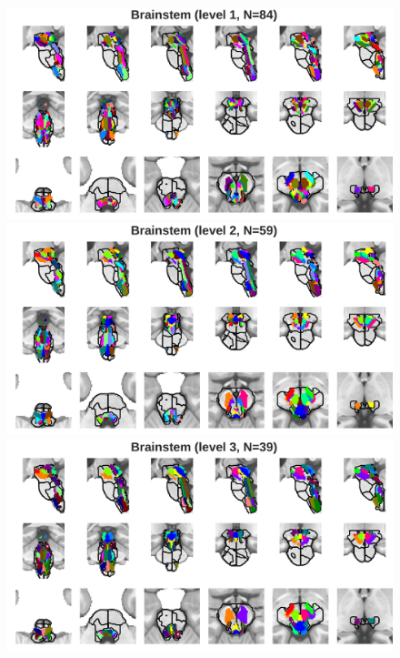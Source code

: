 \documentclass[10pt,letterpaper]{article}
\begin{document}
\begin{figure}[t]
\centering
\begin{minipage}{\linewidth}
\includegraphics[width=\linewidth]{images/bstem_fine.png}
\end{minipage}
\begin{minipage}{\linewidth}
\includegraphics[width=\linewidth]{images/bstem_coarse.png}
\end{minipage}
\begin{minipage}{\linewidth}
\includegraphics[width=\linewidth]{images/bstem_coarser.png}

\end{minipage}
\end{figure}
\end{document}
